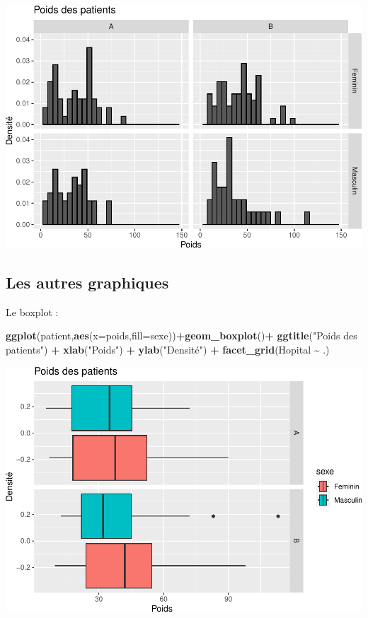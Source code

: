 \documentclass[
]{book}
\newenvironment{Shaded}{\begin{snugshade}}{\end{snugshade}}
\newcommand{\AttributeTok}[1]{\textcolor[rgb]{0.13,0.29,0.53}{#1}}
\newcommand{\FunctionTok}[1]{\textcolor[rgb]{0.13,0.29,0.53}{\textbf{#1}}}
\newcommand{\NormalTok}[1]{#1}
\newcommand{\SpecialCharTok}[1]{\textcolor[rgb]{0.81,0.36,0.00}{\textbf{#1}}}
\newcommand{\StringTok}[1]{\textcolor[rgb]{0.31,0.60,0.02}{#1}}
\begin{document}
\includegraphics{_main_files/figure-latex/ggplot11-1.pdf}

\subsection{Les autres graphiques}\label{les-autres-graphiques}

Le boxplot :

\begin{Shaded}
\begin{Highlighting}[]
\FunctionTok{ggplot}\NormalTok{(patient,}\FunctionTok{aes}\NormalTok{(}\AttributeTok{x=}\NormalTok{poids,}\AttributeTok{fill=}\NormalTok{sexe))}\SpecialCharTok{+}\FunctionTok{geom\_boxplot}\NormalTok{()}\SpecialCharTok{+}
  \FunctionTok{ggtitle}\NormalTok{(}\StringTok{"Poids des patients"}\NormalTok{) }\SpecialCharTok{+} 
  \FunctionTok{xlab}\NormalTok{(}\StringTok{"Poids"}\NormalTok{) }\SpecialCharTok{+} 
  \FunctionTok{ylab}\NormalTok{(}\StringTok{"Densité"}\NormalTok{) }\SpecialCharTok{+}
  \FunctionTok{facet\_grid}\NormalTok{(Hopital }\SpecialCharTok{\textasciitilde{}}\NormalTok{ .)}
\end{Highlighting}
\end{Shaded}

\includegraphics{_main_files/figure-latex/ggplot12-1.pdf}
\end{document}
